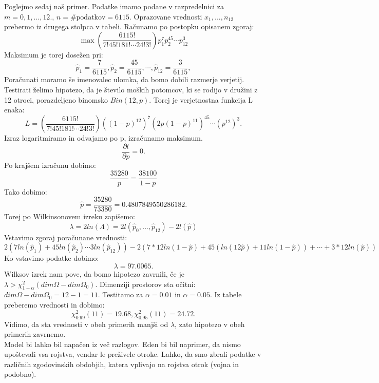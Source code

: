 \documentclass{article}
\begin{document}
Poglejmo sedaj naš primer. Podatke imamo podane v razpredelnici za $m=0,1,...,12.$, $n = \text{\# podatkov} = 6115.$ Oprazovane vrednosti $x_1,...,n_{12}$ prebermo iz drugega stolpca v tabeli. Računamo po postopku opisanem zgoraj:
\begin{equation*}
\max \left( \frac{6115!}{7! 45! 181! \cdots 24!3!}  \right) p_1^7 p_2^{45}\cdots p_{12}^3
\end{equation*}
Maksimum je torej dosežen pri:
\begin{equation*}
\hat{p}_1 = \frac{7}{6115}, \hat{p}_2 = \frac{45}{6115}, \cdots, \hat{p}_{12} = \frac{3}{6115}, 
\end{equation*}
Poračunati moramo še imenovalec ulomka, da bomo dobili razmerje verjetij. Testirati želimo hipotezo, da je število moških potomcov, ki se rodijo v družini z 12 otroci, porazdeljeno binomsko $Bin(12,p)$. Torej je verjetnostna funkcija L enaka:
\begin{equation*}
L = \left( \frac{6115!}{7! 45! 181! \cdots 24!3!}  \right) \left( (1-p)^{12} \right)^7 \left( 2p(1-p)^{11}\right)^{45} \cdots \left( p^{12}\right)^3.
\end{equation*}
Izraz logaritmiramo in odvajamo po p, izračunamo maksimum.
\begin{equation*}
\frac{\partial l}{\partial p} = 0.
\end{equation*}
Po krajšem izračunu dobimo:
\begin{equation*}
\frac{35280}{p} = \frac{38100}{1-p}
\end{equation*}
Tako dobimo:
\begin{equation*}
\hat{p} = \frac{35280}{73380} = 0.4807849550286182.
\end{equation*}
Torej po Wilkinsonovem izreku zapišemo:
\begin{equation*}
\lambda = 2ln(\Lambda) = 2 l(\hat{p}_0,...,\hat{p}_{12}) - 2l(\hat{p})
\end{equation*}
Vstavimo zgoraj poračunane vrednosti:
\begin{equation*}
2\left( 7ln(\hat{p}_1) + 45ln(\hat{p}_2)\cdots 3ln(\hat{p}_{12}) \right)- 2 \left( 7*12ln(1-\hat{p}) + 45(ln(12\hat{p})+11ln(1-\hat{p})) + \cdots + 3*12ln(\hat{p})\right)
\end{equation*}
Ko vstavimo podatke dobimo:
\begin{equation*}
\lambda = 97.0065.
\end{equation*}
Wilksov izrek nam pove, da bomo hipotezo zavrnili, če je $\lambda > \chi^2_{1-\alpha}(dim\Omega - dim\Omega_0)$.
Dimenziji prostorov sta očitni: $dim\Omega - dim\Omega_0 = 12-1 = 11$. Testitamo za $\alpha = 0.01 $ in $\alpha = 0.05$. Iz tabele preberemo vrednosti in dobimo:
\begin{equation*}
\chi^2_{0.99}(11) = 19.68, \chi^2_{0.95}(11) = 24.72.
\end{equation*}
Vidimo, da sta vrednosti v obeh primerih manjši od $\lambda$, zato hipotezo v obeh primerih zavrnemo.\\
Model bi lahko bil napačen iz več razlogov. Eden bi bil naprimer, da nismo upoštevali vsa rojstva, vendar le preživele otroke. Lahko, da smo zbrali podatke v različnih zgodovinskih obdobjih, katera vplivajo na rojstva otrok (vojna in podobno).
\end{document}
